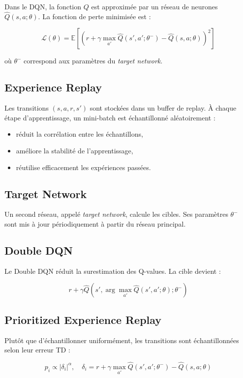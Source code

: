 \documentclass[12pt,a4paper]{article}
\begin{document}
Dans le DQN, la fonction $Q$ est approximée par un réseau de neurones $\hat{Q}(s,a;\theta)$. La fonction de perte minimisée est :

\[
\mathcal{L}(\theta) =
\mathbb{E}\left[
\left(
r + \gamma \max_{a'} \hat{Q}(s',a';\theta^-)
- \hat{Q}(s,a;\theta)
\right)^2
\right]
\]

où $\theta^-$ correspond aux paramètres du \textit{target network}.

\subsection{Experience Replay}

Les transitions $(s,a,r,s')$ sont stockées dans un buffer de replay. À chaque étape d'apprentissage, un mini-batch est échantillonné aléatoirement :
\begin{itemize}
    \item réduit la corrélation entre les échantillons,
    \item améliore la stabilité de l'apprentissage,
    \item réutilise efficacement les expériences passées.
\end{itemize}

\subsection{Target Network}

Un second réseau, appelé \textit{target network}, calcule les cibles. Ses paramètres $\theta^-$ sont mis à jour périodiquement à partir du réseau principal.

\subsection{Double DQN}

Le Double DQN réduit la surestimation des Q-values. La cible devient :

\[
r + \gamma \hat{Q}(s', \arg\max_{a'} \hat{Q}(s',a';\theta); \theta^-)
\]

\subsection{Prioritized Experience Replay}

Plutôt que d'échantillonner uniformément, les transitions sont échantillonnées selon leur erreur TD :

\[
p_i \propto |\delta_i|^{\alpha}, \quad \delta_i = r + \gamma \max_{a'} \hat{Q}(s',a';\theta^-) - \hat{Q}(s,a;\theta)
\]
\end{document}
